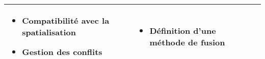 \begin{tabular}{p{.2\textheight}>{\small}L{.35\textheight}>{\small}L{.35\textheight}}
\begin{minipage}[t]{.35\textheight}
    \begin{itemize}
    \item Compatibilité avec la spatialisation
    \item Gestion des conflits
    \end{itemize}
  \end{minipage}& \begin{minipage}[t]{.35\textheight}
    \begin{itemize}
    \item Définition d'une méthode de fusion
    \end{itemize}
  \end{minipage} \\
  \bottomrule
\end{tabular}
